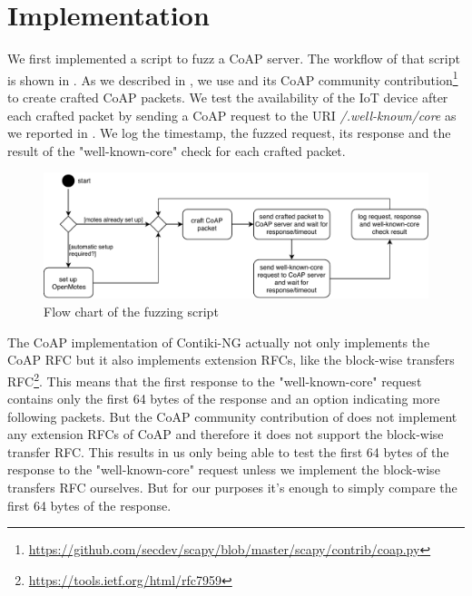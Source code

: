 \section{Implementation}
\label{section:implementation}


We first implemented a script to fuzz a CoAP server. The workflow of that script is shown in . As we described in , we use \scapy and its CoAP community contribution\footnote{\url{https://github.com/secdev/scapy/blob/master/scapy/contrib/coap.py}} to create crafted CoAP packets. We test the availability of the IoT device after each crafted packet by sending a CoAP request to the URI \textit{/.well-known/core} as we reported in . We log the timestamp, the fuzzed request, its response and the result of the "well-known-core" check for each crafted packet.

\begin{figure}
	\centering
	\includegraphics[width=\textwidth]{images/fuzzing_flow_chart}
	\caption{Flow chart of the fuzzing script}
	\label{figure:fuzz_flow_chart}
\end{figure}

The CoAP implementation of Contiki-NG actually not only implements the CoAP RFC but it also implements extension RFCs, like the block-wise transfers RFC\footnote{\url{https://tools.ietf.org/html/rfc7959}}. This means that the first response to the "well-known-core" request contains only the first 64 bytes of the response and an option indicating more following packets. But the CoAP community contribution of \scapy does not implement any extension RFCs of CoAP and therefore it does not support the block-wise transfer RFC. This results in us only being able to test the first 64 bytes of the response to the "well-known-core" request unless we implement the block-wise transfers RFC ourselves. But for our purposes it's enough to simply compare the first 64 bytes of the response.

